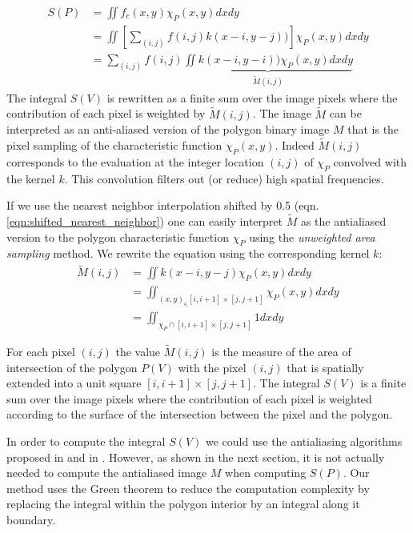 \documentclass[11pt]{article}
\begin{document}
\begin{equation}
\begin{split}
S(P)&=\iint f_c(x,y)\chi_P(x,y) dxdy\\
&=\iint \left[\sum_{(i,j)} f(i,j) k(x-i,y-j))\right]\chi_P(x,y)  dxdy\\
&=\sum_{(i,j)}  f(i,j) \underbrace{\iint  k(x-i,y-i))\chi_P(x,y)  dxdy}_{\tilde{M}(i,j)}
\end{split}
\label{eqn:antialiased_mask}
\end{equation}
The integral $S(V)$ is rewritten as a finite sum over the image pixels where the contribution of each pixel is weighted by $\tilde{M}(i,j)$.
The image $\tilde{M}$ can be interpreted as an anti-aliased version of the polygon binary image $M$ that is the pixel sampling of the characteristic function $\chi_P(x,y)$. Indeed $\tilde{M}(i,j)$ corresponds to the evaluation at the integer location $(i,j)$ of $\chi_P$ convolved with the kernel $k$. This convolution filters out (or reduce) high spatial frequencies. 


If we use the nearest neighbor interpolation shifted by 0.5 (eqn.\ref{eqn:shifted_nearest_neighbor}) one can easily interpret $\tilde{M}$ as the antialiased version to the polygon characteristic function $\chi_P$ using the \emph{unweighted area sampling} method. We rewrite the equation using the corresponding kernel $k$:
\begin{equation}
\begin{split}
\tilde{M}(i,j)&=\iint  k(x-i,y-j)\chi_P(x,y)  dxdy\\
&=\iint_{(x,y)_\in[i,i+1]\times[j,j+1]} \chi_P(x,y)dxdy\\
&=\iint_{\chi_P\cap[i,i+1]\times[j,j+1]} 1 dxdy
\end{split}
\end{equation}

For each pixel $(i,j)$ the value $\tilde{M}(i,j)$ is the measure of the area of intersection of the polygon $P(V)$ with the pixel $(i,j)$ that is spatially extended into a unit square $[i,i+1]\times[j,j+1]$. 
The integral $S(V)$ is a finite sum over the image pixels where the contribution of each pixel is weighted according to the surface of the intersection between the pixel and the polygon.

In order to compute the integral $S(V)$ we could use the antialiasing algorithms proposed in \cite{Catmull1978} and in \cite{Duff1989}. However, as shown in the next section, it is not actually needed to compute the antialiased image $M$ when computing $S(P)$. Our method uses the Green theorem to reduce the computation complexity by replacing the integral within the polygon interior by an integral along it boundary.
\end{document}
